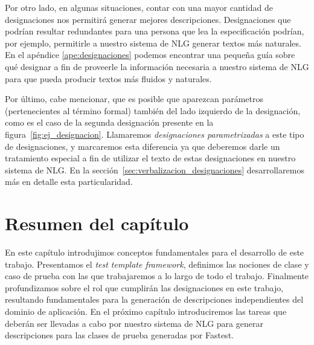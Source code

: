 Por otro lado, en algunas situaciones, contar con una mayor cantidad de designaciones nos permitirá generar mejores descripciones. Designaciones que podrían resultar redundantes para una persona que lea la especificación podrían, por ejemplo, permitirle a nuestro sistema de NLG generar textos más naturales. En el apéndice \ref{ape:designaciones} podemos encontrar una pequeña guía sobre qué designar a fin de proveerle la información necesaria a nuestro sistema de NLG para que pueda producir textos más fluidos y naturales.

Por último, cabe mencionar, que es posible que aparezcan parámetros (pertenecientes al término formal) también del lado izquierdo de la designación, como es el caso de la segunda designación presente en la figura~\ref{fig:ej_designacion}. Llamaremos \emph{designaciones parametrizadas} a este tipo de designaciones, y marcaremos esta diferencia ya que deberemos darle un tratamiento especial a fin de utilizar el texto de estas designaciones en nuestro sistema de NLG. En la sección~\ref{sec:verbalizacion_designaciones} desarrollaremos más en detalle esta particularidad. 


\section{Resumen del capítulo}
En este capítulo introdujimos conceptos fundamentales para el desarrollo de este trabajo. Presentamos el \textit{test template framework}, definimos las nociones de clase y caso de prueba con las que trabajaremos a lo largo de todo el trabajo. Finalmente profundizamos sobre el rol que cumplirán las designaciones en este trabajo, resultando fundamentales para la generación de descripciones independientes del dominio de aplicación. En el próximo capítulo introduciremos las tareas que deberán ser llevadas a cabo por nuestro sistema de NLG para generar descripciones para las clases de prueba generadas por Fastest.